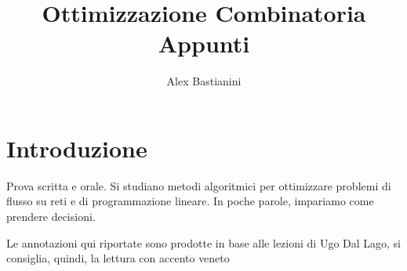 \documentclass{report}
\title{\Huge{Ottimizzazione Combinatoria}\\Appunti}
\author{\huge{Alex Bastianini}}
\date{}
\begin{document}
\maketitle
\newpage%
\tableofcontents

\pagebreak

\chapter{Introduzione}
Prova scritta e orale. Si studiano metodi algoritmici per ottimizzare problemi di flusso su reti e di programmazione lineare. In poche parole, impariamo come prendere decisioni. 

Le annotazioni qui riportate sono prodotte in base alle lezioni di Ugo Dal Lago, si consiglia, quindi, la lettura con accento veneto



\end{document}
